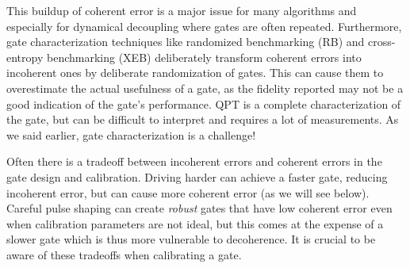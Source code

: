 This buildup of coherent error is a major issue for many algorithms and especially for dynamical decoupling where gates are often repeated. Furthermore, gate characterization techniques like randomized benchmarking (RB) and cross-entropy benchmarking (XEB) deliberately transform coherent errors into incoherent ones by deliberate randomization of gates. This can cause them to overestimate the actual usefulness of a gate, as the fidelity reported may not be a good indication of the gate's performance. QPT is a complete characterization of the gate, but can be difficult to interpret and requires a lot of measurements. As we said earlier, gate characterization is a challenge!

Often there is a tradeoff between incoherent errors and coherent errors in the gate design and calibration. Driving harder can achieve a faster gate, reducing incoherent error, but can cause more coherent error (as we will see below). Careful pulse shaping can create \textit{robust} gates that have low coherent error even when calibration parameters are not ideal, but this comes at the expense of a slower gate which is thus more vulnerable to decoherence. It is crucial to be aware of these tradeoffs when calibrating a gate.

